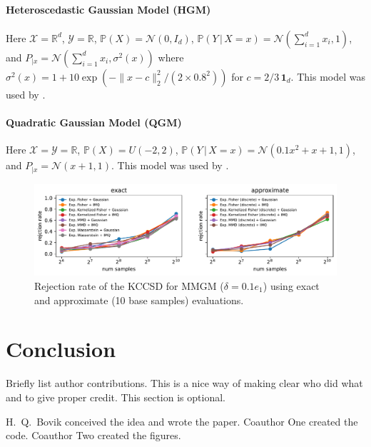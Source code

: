 \documentclass{uai2023} %
\begin{document}
\paragraph{Heteroscedastic Gaussian Model (HGM)}
Here $\mathcal{X} = \mathbb{R}^d$, $\mathcal{Y} = \mathbb{R}$, $\mathbb{P}(X) = \mathcal{N}(0, I_d)$, $\mathbb{P}(Y \,|\, X = x) = \mathcal{N}(\sum_{i=1}^d x_i, 1)$, and $P_{|x} = \mathcal{N}(\sum_{i=1}^d x_i, \sigma^2(x))$ where $\sigma^2(x) = 1 + 10 \exp{(- \|x - c\|^2_2 / (2 \times 0.8^2))}$ for $c = 2/3 \,\bm{1}_d$.
This model was used by \citet{jitkrittum2020testing}.

\paragraph{Quadratic Gaussian Model (QGM)}
Here $\mathcal{X} = \mathcal{Y} = \mathbb{R}$, $\mathbb{P}(X) = U(-2, 2)$, $\mathbb{P}(Y \,|\, X = x) = \mathcal{N}(0.1 x^2 + x + 1, 1)$, and $P_{|x} = \mathcal{N}(x + 1, 1)$.
This model was used by \citet{jitkrittum2020testing}.

\begin{figure}
    \centering
    \includegraphics[width=\linewidth]{paper/figures/pmgm_kccsd_delta=0.1_shift-dim=1.pdf}
    \caption{Rejection rate of the KCCSD for MMGM ($\delta = 0.1 e_1$) using exact and approximate (10 base samples) evaluations.}
    \label{fig:mmgm_kccsd_first}
\end{figure}

\section{Conclusion} \label{conclusion}


\begin{contributions} %
    Briefly list author contributions. 
    This is a nice way of making clear who did what and to give proper credit.
    This section is optional.

    H.~Q.~Bovik conceived the idea and wrote the paper.
    Coauthor One created the code.
    Coauthor Two created the figures.
\end{contributions}
\end{document}
